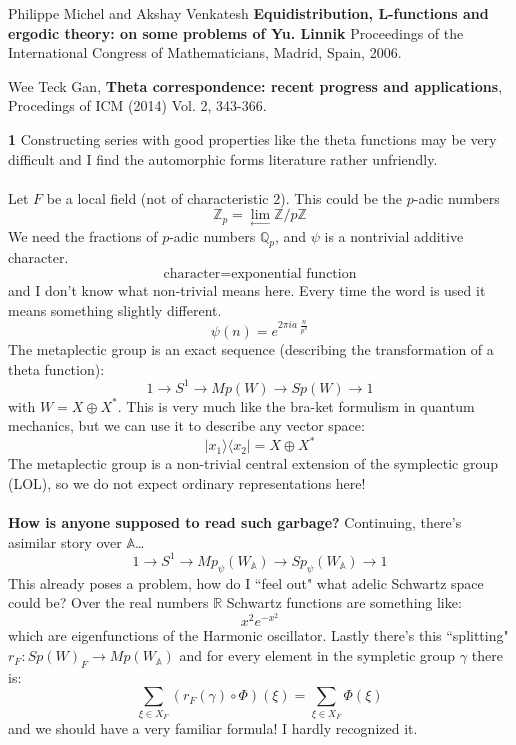 \documentclass[12pt]{article}
\begin{document}
\selectfont \fontsize{12}{10}\selectfont

\begin{thebibliography}{}

\item Philippe Michel and Akshay Venkatesh \textbf{Equidistribution, L-functions and ergodic theory: on some problems of Yu. Linnik} Proceedings of the International Congress
of Mathematicians, Madrid, Spain, 2006.

\item  Wee Teck Gan, \textbf{Theta correspondence: recent progress and applications}, Procedings of
ICM (2014) Vol. 2, 343-366.

\end{thebibliography}


\newpage

\noindent \textbf{1} \quad Constructing series with good properties like the theta functions may be very difficult and I find the automorphic forms literature rather unfriendly.  \\ \\
Let $F$ be a local field (not of characteristic $2$).  This could be the $p$-adic numbers 
$$ \mathbb{Z}_p = \lim_{\longleftarrow} \mathbb{Z}/p\mathbb{Z} $$
We need the fractions of $p$-adic numbers $\mathbb{Q}_p$, and $\psi$ is a nontrivial additive character.  
$$ \text{character} = \text{exponential function}$$
and I don't know what non-trivial means here.  Every time the word is used it means something slightly different. 
$$ \psi(n) = e^{2\pi i a\; \frac{n}{p^k}} $$
The metaplectic group is an exact sequence (describing the transformation of a theta function):
$$ 1 \to S^1 \to Mp(W) \to Sp(W) \to 1 $$
with $W = X \oplus X^\ast$. This is very much like the bra-ket formulism in quantum mechanics, but we can use it to describe any vector space:
$$ |x_1 \rangle \langle x_2 | = X \oplus X^\ast$$
The metaplectic group is a non-trivial central extension of the symplectic group (LOL), so we do not expect ordinary representations here! \\ \\
\textbf{How is anyone supposed to read such garbage?} Continuing, there's asimilar story over $\mathbb{A}$\dots
$$
1 \to S^1 \to Mp_\psi (W_\mathbb{A}) 
\to Sp_\psi (W_\mathbb{A}) \to 1
 $$
This already poses a problem, how do I ``feel out" what adelic Schwartz space could be?  Over the real numbers 
$\mathbb{R}$ Schwartz functions are something like:
$$ x^2 e^{-x^2} $$
which are eigenfunctions of the Harmonic oscillator. Lastly there's this ``splitting" $r_F : Sp(W)_F \to Mp(W_\mathbb{A})$ and for every element in the sympletic group $\gamma$ there is:
$$ \sum_{\xi \in X_F} (r_F(\gamma) \circ \Phi) (\xi) = \sum_{\xi \in X_F} \Phi(\xi) $$ 
and we should have a very familiar formula!  I hardly recognized it.
\end{document}
